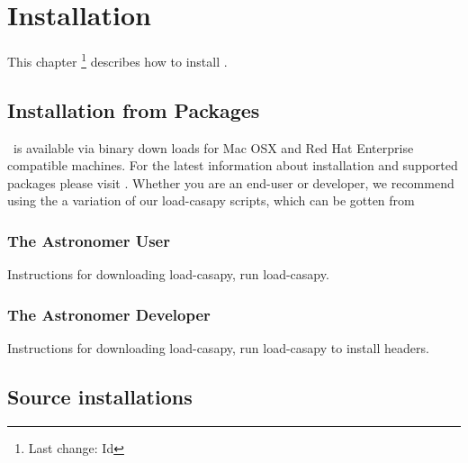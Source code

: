 \chapter{Installation}
\label{Installation}

This chapter \footnote{Last change:
$ $Id$ $}
describes how to install \aipspp.

\section{Installation from Packages}
\casa\ is available via binary down loads for Mac OSX and Red Hat
Enterprise compatible machines.
For the latest information about installation and supported packages
please visit . Whether you are an end-user or
developer, we recommend using the a variation of our load-casapy scripts,
which can be gotten from 

\subsection{The Astronomer User}
\label{End-user installation}
\label{Astronomer installation}

Instructions for downloading load-casapy, run load-casapy.

\subsection{The Astronomer Developer}
\label{developers-release}

Instructions for downloading load-casapy, run load-casapy to install headers.


\section{Source \casa installations}
\label{Source installation}

